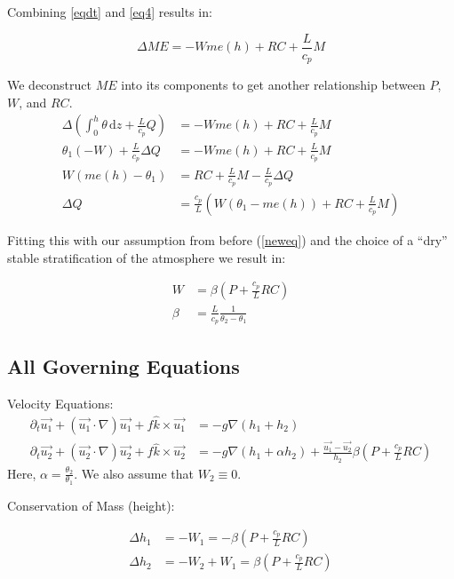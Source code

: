 \documentclass[10pt]{article}
\newcommand{\rmd}{\,\mathrm{d}}
\begin{document}
Combining \ref{eqdt} and \ref{eq4} results in:

\begin{equation}
 \Delta ME = -W me(h) + RC + \frac{L}{c_p} M
\end{equation}

We deconstruct $ME$ into its components to get another relationship between $P$, $W$, and $RC$. 
\begin{align*}
\Delta \left(\int_{0}^{h}\theta \rmd z + \frac{L}{c_p}Q \right) &= -W me(h) + RC + \frac{L}{c_p} M \\
\theta_1(-W) + \frac{L}{c_p}\Delta Q &=  -W me(h) + RC + \frac{L}{c_p} M \\
W \left(me(h) - \theta_1 \right) &= RC + \frac{L}{c_p} M  - \frac{L}{c_p}\Delta Q\\
\Delta Q &=\frac{c_p}{L} \left(W \left(\theta_1 - me(h) \right) + RC + \frac{L}{c_p} M  \right)
\end{align*}

Fitting this with our assumption from before (\ref{neweq}) and the choice of a ``dry'' stable stratification of the atmosphere we result in:

\begin{align}
W &= \beta\left(P+\frac{c_p}{L} RC\right)\\
\beta &= \frac{L}{c_p}\frac{1}{\theta_2-\theta_1}
\end{align}

\subsection{All Governing Equations}

Velocity Equations:
\begin{align}
\partial_t \vec{u_1} + (\vec{u_1}\cdot \nabla )\vec{u_1} +  f\hat{k} \times \vec{u_1} &= -g \nabla (h_1 + h_2)	\\
\partial_t \vec{u_2} + (\vec{u_2}\cdot \nabla )\vec{u_2} +  f\hat{k} \times \vec{u_2} &= -g \nabla (h_1 + \alpha h_2)	 + \frac{\vec{u_1}-\vec{u_2}}{h_2}\beta \left(P + \frac{c_p}{L}RC \right)
\label{DVel}
\end{align}
Here, $\alpha = \frac{\theta_2}{\theta_1}$. 
We also assume that $W_2 \equiv 0$.

Conservation of Mass (height):

\begin{align}
\Delta h_1 &= -W_1 = -\beta \left(P + \frac{c_p}{L}RC\right)\\
\Delta h_2 &= -W_2 + W_1 = \beta \left(P + \frac{c_p}{L}RC\right)
\label{DHei}
\end{align}
\end{document}
